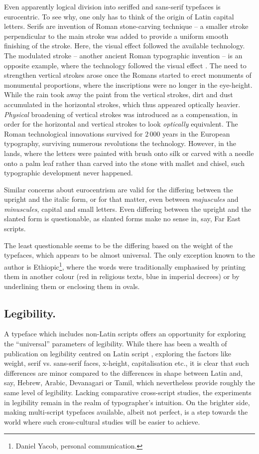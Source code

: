 \documentclass[english]{eurotex2003}
\begin{document}
Even apparently logical division into seriffed and sans-serif
typefaces is eurocentric. To see why, one only has to think of the
origin of Latin capital letters. Serifs are invention of Roman
stone-carving technique -- a smaller stroke perpendicular to the main
stroke was added to provide a uniform smooth finishing of the stroke.
Here, the visual effect followed the available technology. The
modulated stroke -- another ancient Roman typographic invention -- is
an opposite example, where the technology followed the visual effect
\cite{Jean}. The need to strengthen vertical strokes arose once the
Romans started to erect monuments of monumental proportions, where the
inscriptions were no longer in the eye-height. While the rain took
away the paint from the vertical strokes, dirt and dust accumulated in
the horizontal strokes, which thus appeared optically
heavier. \emph{Physical} broadening of vertical strokes was introduced
as a compensation, in order for the horizontal and vertical strokes to
look \emph{optically} equivalent. The Roman technological innovations
survived for $2\,000$ years in the European typography, surviving
numerous revolutions the technology. However, in the lands, where
the letters were painted with brush onto silk or carved with a needle
onto a palm leaf rather than carved into the stone with mallet and
chisel, such typographic development never happened.

Similar concerns about eurocentrism are valid for the differing
between the upright and the italic form, or for that matter, even
between \emph{majuscules} and \emph{minuscules}, capital and small
letters. Even differing between the upright and the slanted form is
questionable, as slanted forms make no sense in, say, Far East
scripts.

The least questionable seems to be the differing based on the weight
of the typefaces, which appears to be almost universal. The only
exception known to the author is Ethiopic\footnote{Daniel Yacob, personal
communication.}, where the words were traditionally
emphasised by printing them in another colour (red in religious texts,
blue in imperial decrees) or by underlining them or enclosing them in
ovals.

\subsection{Legibility.}

A typeface which includes non-Latin scripts offers an opportunity for
exploring the ``universal'' parameters of legibility. While there has
been a wealth of publication on legibility centred on Latin script
\cite{Tinker,Zachrisson,deLange,Lund}, exploring the factors like weight,
serif vs. sans-serif faces, x-height, capitalisation etc., it is clear
that such differences are minor compared to the differences in shape
between Latin and, say, Hebrew, Arabic, Devanagari or Tamil, which
nevertheless provide roughly the same level of legibility. Lacking
comparative cross-script studies, the experiments in legibility remain
in the realm of typographer's intuition. On the brighter side, making
multi-script typefaces available, albeit not perfect, is a step
towards the world where such cross-cultural studies will be easier to
achieve.
\end{document}
